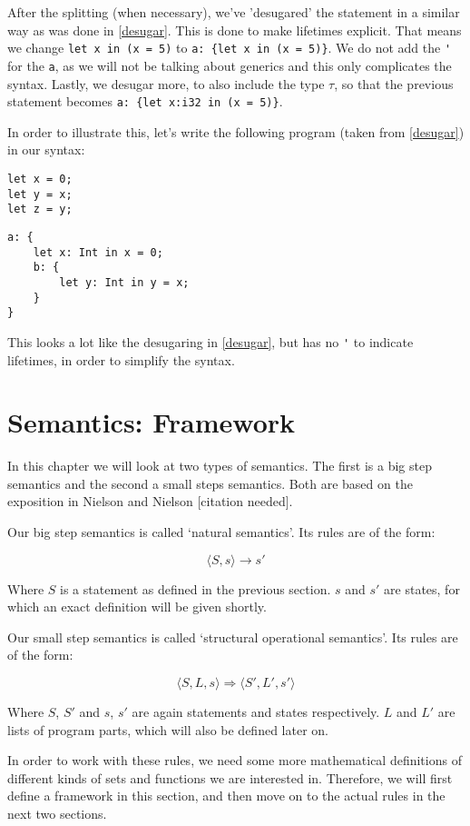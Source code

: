After the splitting (when necessary), we've 'desugared' the statement in a similar way as was done in \ref{desugar}. This is done to make lifetimes explicit. That means we change \verb|let x in (x = 5)| to \verb|a: {let x in (x = 5)}|. We do not add the \verb|'| for the \verb|a|, as we will not be talking about generics and this only complicates the syntax. Lastly, we desugar more, to also include the type $\tau$, so that the previous statement becomes \verb|a: {let x:i32 in (x = 5)}|. 

In order to illustrate this, let's write the following program (taken from \ref{desugar}) in our syntax: 

\begin{verbatim}
let x = 0;
let y = x;
let z = y;
\end{verbatim}

\begin{verbatim}
a: {
    let x: Int in x = 0;
    b: {
        let y: Int in y = x;
    }
}
\end{verbatim}

This looks a lot like the desugaring in \ref{desugar}, but has no \verb|'| to indicate lifetimes, in order to simplify the syntax.


\section{Semantics: Framework}
In this chapter we will look at two types of semantics. The first is a big step semantics and the second a small steps semantics. Both are based on the exposition in Nielson and Nielson [citation needed]. 

Our big step semantics is called `natural semantics'. Its rules are of the form: 

$$\langle S, s \rangle \to s'$$

Where $S$ is a statement as defined in the previous section. $s$ and $s'$ are states, for which an exact definition will be given shortly. 

Our small step semantics is called `structural operational semantics'. Its rules are of the form:

$$\langle S, L, s \rangle \Rightarrow \langle S', L', s' \rangle$$

Where $S$, $S'$ and $s$, $s'$ are again statements and states respectively. $L$ and $L'$ are lists of program parts, which will also be defined later on. 

In order to work with these rules, we need some more mathematical definitions of different kinds of sets and functions we are interested in. Therefore, we will first define a framework in this section, and then move on to the actual rules in the next two sections. 


